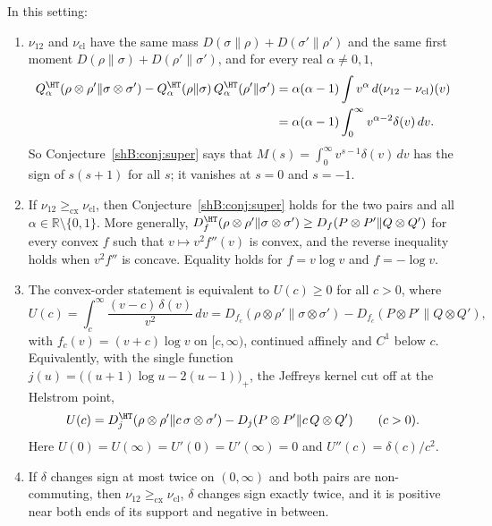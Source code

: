 \begin{theorem}\label{shB:thm:frenkel}
In this setting:
\begin{enumerate}[label=(\alph*)]
\item $\nu_{12}$ and $\nu_{\mathrm{cl}}$ have the same mass $D(\sigma\|\rho)+D(\sigma'\|\rho')$ and the same first moment $D(\rho\|\sigma)+D(\rho'\|\sigma')$, and for every real $\alpha\ne0,1$,
\[
\begin{aligned}
Q^\HT_\alpha(\rho\otimes\rho'\|\sigma\otimes\sigma')-Q^\HT_\alpha(\rho\|\sigma)\,Q^\HT_\alpha(\rho'\|\sigma')&=\alpha(\alpha-1)\int v^\alpha\,d(\nu_{12}-\nu_{\mathrm{cl}})(v)\\&=\alpha(\alpha-1)\int_0^\infty v^{\alpha-2}\delta(v)\,dv .
\end{aligned}
\]
So Conjecture~\ref{shB:conj:super} says that $M(s)=\int_0^\infty v^{s-1}\delta(v)\,dv$ has the sign of $s(s+1)$ for all $s$; it vanishes at $s=0$ and $s=-1$.
\item If $\nu_{12}\ge_{\mathrm{cx}}\nu_{\mathrm{cl}}$, then Conjecture~\ref{shB:conj:super} holds for the two pairs and all $\alpha\in\mathbb R\setminus\{0,1\}$. More generally, $D^\HT_f(\rho\otimes\rho'\|\sigma\otimes\sigma')\ge D_f(P\otimes P'\|Q\otimes Q')$ for every convex $f$ such that $v\mapsto v^2f''(v)$ is convex, and the reverse inequality holds when $v^2f''$ is concave. Equality holds for $f=v\log v$ and $f=-\log v$.
\item The convex-order statement is equivalent to $U(c)\ge0$ for all $c>0$, where
\[
U(c)=\int_c^\infty\frac{(v-c)\,\delta(v)}{v^2}\,dv=D_{f_c}(\rho\otimes\rho'\|\sigma\otimes\sigma')-D_{f_c}(P\otimes P'\|Q\otimes Q'),
\]
with $f_c(v)=(v+c)\log v$ on $[c,\infty)$, continued affinely and $C^1$ below $c$. Equivalently, with the single function $j(u)=\big((u+1)\log u-2(u-1)\big)_+$, the Jeffreys kernel cut off at the Helstrom point,
\[
U(c)=D^\HT_j(\rho\otimes\rho'\|c\,\sigma\otimes\sigma')-D_j(P\otimes P'\|c\,Q\otimes Q')\qquad(c>0).
\]
Here $U(0)=U(\infty)=U'(0)=U'(\infty)=0$ and $U''(c)=\delta(c)/c^2$.
\item If $\delta$ changes sign at most twice on $(0,\infty)$ and both pairs are non-commuting, then $\nu_{12}\ge_{\mathrm{cx}}\nu_{\mathrm{cl}}$, $\delta$ changes sign exactly twice, and it is positive near both ends of its support and negative in between.
\end{enumerate}
\end{theorem}

